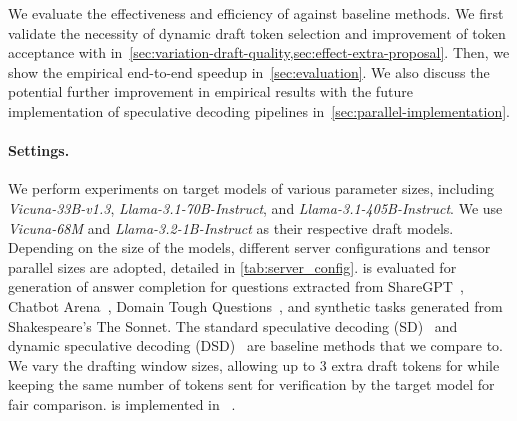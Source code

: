 

We evaluate the effectiveness and efficiency of \alg{} against baseline methods.
We first validate the necessity of dynamic draft token selection and improvement of token acceptance with \alg{} in~\cref{sec:variation-draft-quality,sec:effect-extra-proposal}.
Then, we show the empirical end-to-end speedup in~\cref{sec:evaluation}.
We also discuss the potential further improvement in empirical results with the future implementation of speculative decoding pipelines in~\cref{sec:parallel-implementation}.


\paragraph{Settings.}
We perform experiments on target models of various parameter sizes, including \textit{Vicuna-33B-v1.3}, \textit{Llama-3.1-70B-Instruct}, and \textit{Llama-3.1-405B-Instruct}.
We use \textit{Vicuna-68M} and \textit{Llama-3.2-1B-Instruct} as their respective draft models.
Depending on the size of the models, different server configurations and tensor parallel sizes are adopted, detailed in \cref{tab:server_config}.
\alg{} is evaluated for generation of answer completion for questions extracted from ShareGPT~\citep{sharegpt-dataset}, Chatbot Arena~\citep{zheng2023arena}, Domain Tough Questions~\citep{yav-ai2024domain-tough}, and synthetic tasks generated from Shakespeare's The Sonnet.
The standard speculative decoding (SD)~\citep{leviathan2023} and dynamic speculative decoding (DSD)~\citep{liu2024optimizingspeculativedecodingserving} are baseline methods that we compare to.
We vary the drafting window sizes, allowing up to 3 extra draft tokens for \alg{} while keeping the same number of tokens sent for verification by the target model for fair comparison.
\alg{} is implemented in \vllm{}~\citep{kwon2023vllm}.
\begin{table}[!ht]
\centering
\caption{Server and model configurations. TP indicates the tensor parallel size used for model serving.}
\label{tab:server_config}
\vspace{-3mm}
\end{table}

